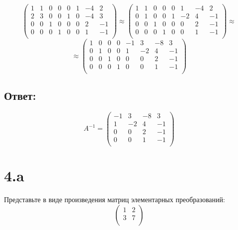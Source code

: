 \documentclass[a4paper]{article}
\begin{document}
\begin{equation*}
  \left(\begin{array}{rrrr|rrrr}
1 & 1 & 0 & 0 & 0 & 1 & -4 & 2\\
2 & 3 & 0 & 0 & 1 & 0 & -4 & 3\\
0 & 0 & 1 & 0 & 0 & 0 & 2 & -1\\
0 & 0 & 0 & 1 & 0 & 0 & 1 & -1\\
   \end{array}\right)
   \approx
  \left(\begin{array}{rrrr|rrrr}
1 & 1 & 0 & 0 & 0 & 1 & -4 & 2\\
0 & 1 & 0 & 0 & 1 & -2 & 4 & -1\\
0 & 0 & 1 & 0 & 0 & 0 & 2 & -1\\
0 & 0 & 0 & 1 & 0 & 0 & 1 & -1\\
   \end{array}\right)
\approx
\end{equation*}
\begin{equation*}
\approx
  \left(\begin{array}{rrrr|rrrr}
1 & 0 & 0 & 0 & -1 & 3 & -8 & 3\\
0 & 1 & 0 & 0 & 1 & -2 & 4 & -1\\
0 & 0 & 1 & 0 & 0 & 0 & 2 & -1\\
0 & 0 & 0 & 1 & 0 & 0 & 1 & -1\\
   \end{array}\right)
\end{equation*}

\subsection{Ответ:}
\begin{equation*}
A^{-1} = \begin{pmatrix}
-1 & 3 & -8 & 3\\
 1 & -2 & 4 & -1\\
0 & 0 & 2 & -1\\
0 & 0 & 1 & -1\\
\end{pmatrix}
\end{equation*}


\section*{4.a}
Представьте в виде произведения матриц элементарных преобразований:
\begin{equation*}
\begin{pmatrix}
1 & 2\\
3 & 7\\
\end{pmatrix}
\end{equation*}
\end{document}
